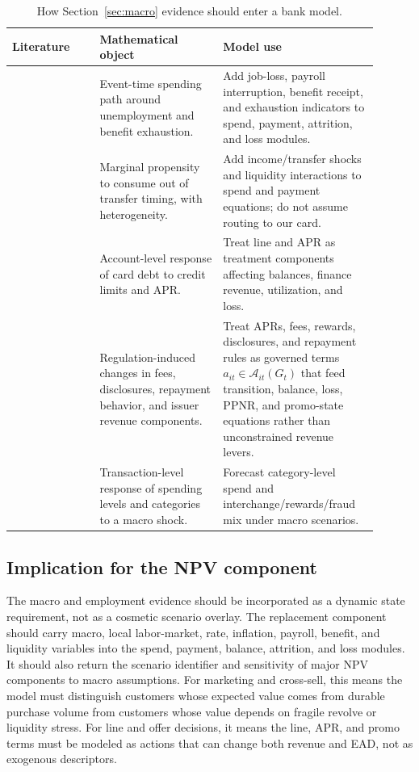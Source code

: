 \documentclass[11pt]{article}
\newcommand{\1}{\mathbf{1}}
\begin{document}
\begin{table}[t]
\centering
\caption{How Section~\ref{sec:macro} evidence should enter a bank model.}
\label{tab:macro-to-model}
\begin{tabular}{p{0.22\linewidth}p{0.31\linewidth}p{0.37\linewidth}}
\toprule
Literature & Mathematical object & Model use \\
\midrule
\citet{ganong2019unemployment}
  & Event-time spending path around unemployment and benefit exhaustion.
  & Add job-loss, payroll interruption, benefit receipt, and exhaustion
    indicators to spend, payment, attrition, and loss modules. \\
\citet{johnson2004rebates}
  & Marginal propensity to consume out of transfer timing, with heterogeneity.
  & Add income/transfer shocks and liquidity interactions to spend and payment
    equations; do not assume routing to our card. \\
\citet{gross2001liquidity}
  & Account-level response of card debt to credit limits and APR.
  & Treat line and APR as treatment components affecting balances, finance
    revenue, utilization, and loss. \\
\citet{agarwal2013cardact}
  & Regulation-induced changes in fees, disclosures, repayment behavior, and
    issuer revenue components.
  & Treat APRs, fees, rewards, disclosures, and repayment rules as governed
    terms $a_{it}\in\mathcal{A}_{it}(G_t)$ that feed transition, balance, loss,
    PPNR, and promo-state equations rather than unconstrained revenue levers. \\
\citet{baker2020epidemic}
  & Transaction-level response of spending levels and categories to a macro
    shock.
  & Forecast category-level spend and interchange/rewards/fraud mix under
    macro scenarios. \\
\bottomrule
\end{tabular}
\end{table}

\subsection{Implication for the NPV component}
\label{subsec:macro-component-implication}

The macro and employment evidence should be incorporated as a dynamic state
requirement, not as a cosmetic scenario overlay. The replacement component
should carry macro, local labor-market, rate, inflation, payroll, benefit, and
liquidity variables into the spend, payment, balance, attrition, and loss
modules. It should also return the scenario identifier and sensitivity of
major NPV components to macro assumptions. For marketing and cross-sell, this
means the model must distinguish customers whose expected value comes from
durable purchase volume from customers whose value depends on fragile revolve
or liquidity stress. For line and offer decisions, it means the line, APR, and
promo terms must be modeled as actions that can change both revenue and EAD,
not as exogenous descriptors.
\end{document}
